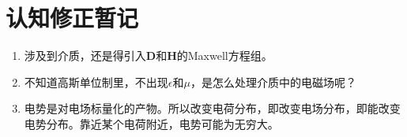 \documentclass[oneside]{ctexbook}  %
\begin{document}
\chapter{认知修正暂记}
\begin{enumerate}
    \item 涉及到介质，还是得引入$\mathbf{D}$和$\mathbf{H}$的Maxwell方程组。
    \item 不知道高斯单位制里，不出现$\epsilon$和$\mu$，是怎么处理介质中的电磁场呢？
    \item 电势是对电场标量化的产物。所以改变电荷分布，即改变电场分布，即能改变电势分布。靠近某个电荷附近，电势可能为无穷大。
\end{enumerate}
\end{document}
